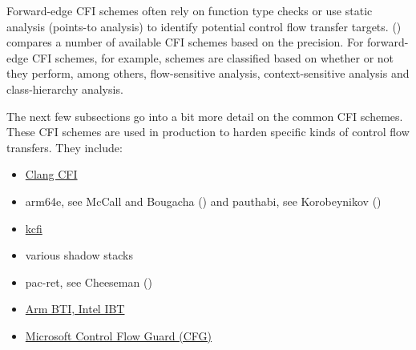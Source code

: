 \documentclass[
  a4paper,
]{report}
\providecommand{\tightlist}{%
  \setlength{\itemsep}{0pt}\setlength{\parskip}{0pt}}
\begin{document}
Forward-edge CFI schemes often rely on function type checks or use
static analysis (points-to analysis) to identify potential control flow
transfer targets. () compares
a number of available CFI schemes based on the precision. For
forward-edge CFI schemes, for example, schemes are classified based on
whether or not they perform, among others, flow-sensitive analysis,
context-sensitive analysis and class-hierarchy analysis.

The next few subsections go into a bit more detail on the common CFI
schemes. These CFI schemes are used in production to harden specific
kinds of control flow transfers. They include:

\begin{itemize}
\tightlist
\item
  \href{https://clang.llvm.org/docs/ControlFlowIntegrityDesign.html}{Clang
  CFI}
\item
  arm64e, see McCall and Bougacha () and
  pauthabi, see Korobeynikov ()
\item
  \href{https://reviews.llvm.org/D119296}{kcfi}
\item
  various shadow stacks
\item
  pac-ret, see Cheeseman ()
\item
  \href{https://en.wikipedia.org/wiki/Indirect_branch_tracking}{Arm BTI,
  Intel IBT}
\item
  \href{https://learn.microsoft.com/en-us/windows/win32/secbp/control-flow-guard}{Microsoft
  Control Flow Guard (CFG)}
\end{itemize}
\end{document}
